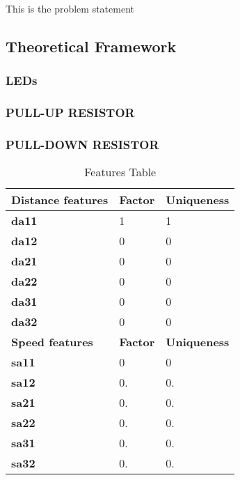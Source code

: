 This is the problem statement

\subsection{Theoretical Framework}


\subsubsection{LEDs}

\subsubsection{PULL-UP RESISTOR}

\subsubsection{PULL-DOWN RESISTOR}

\begin{table}[!h]
\centering
\caption{Features Table}
\label{tab:FeatureTable}
\normalsize{%
\begin{tabular}{|l|l|l|}
\hline
\textbf{Distance   features} & \textbf{Factor} & \textbf{Uniqueness} \\ \hline
\textbf{da11} & 1 & 1 \\ \hline
\textbf{da12} & 0 & 0 \\ \hline
\textbf{da21} & 0 & 0 \\ \hline
\textbf{da22} & 0 & 0 \\ \hline
\textbf{da31} & 0 & 0 \\ \hline
\textbf{da32} & 0 & 0 \\ \hline
\textbf{Speed features} & \textbf{Factor} & \textbf{Uniqueness} \\ \hline
\textbf{sa11} & 0 & 0 \\ \hline
\textbf{sa12} & 0. & 0. \\ \hline
\textbf{sa21} & 0. & 0. \\ \hline
\textbf{sa22} & 0. & 0. \\ \hline
\textbf{sa31} & 0. & 0. \\ \hline
\textbf{sa32} & 0. & 0. \\ \hline
\end{tabular}%
}
\end{table}